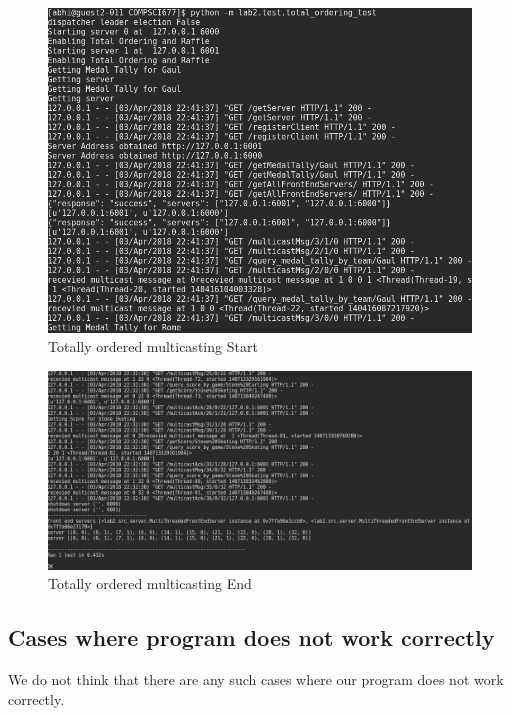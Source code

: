 \documentclass{article}
\begin{document}
\begin{figure}[H]
        \centering
        \includegraphics[width=\textwidth]{outputs/total_ordering_test_start.png}
        \caption{Totally ordered multicasting Start \label{fig:clong_synchronization}}
\end{figure}

\begin{figure}[H]
        \centering
        \includegraphics[width=\textwidth]{outputs/total_order_test.png}
        \caption{Totally ordered multicasting End \label{fig:clong_synchronization}}
\end{figure}



\subsection{Cases where program does not work correctly}
We do not think that there are any such cases where our program does not work
correctly.
\end{document}
